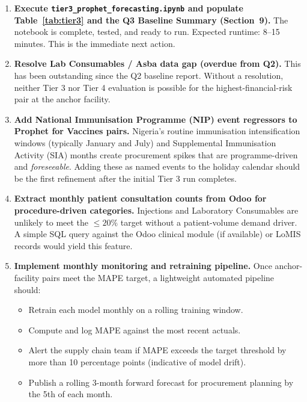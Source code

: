 \documentclass[12pt, a4paper]{article}
\begin{document}
\begin{enumerate}[leftmargin=1.5em, itemsep=7pt]
  \item \textbf{Execute \texttt{tier3\_prophet\_forecasting.ipynb} and
        populate Table~\ref{tab:tier3} and the Q3 Baseline Summary
        (Section~9).}
        The notebook is complete, tested, and ready to run. Expected
        runtime: 8--15 minutes. This is the immediate next action.

  \item \textbf{Resolve Lab Consumables / Asba data gap (overdue from Q2).}
        This has been outstanding since the Q2 baseline report. Without
        a resolution, neither Tier 3 nor Tier 4 evaluation is possible
        for the highest-financial-risk pair at the anchor facility.

  \item \textbf{Add National Immunisation Programme (NIP) event
        regressors to Prophet for Vaccines pairs.}
        Nigeria's routine immunisation intensification windows
        (typically January and July) and Supplemental Immunisation
        Activity (SIA) months create procurement spikes that are
        programme-driven and \textit{foreseeable}. Adding these as
        named events to the holiday calendar should be the first
        refinement after the initial Tier 3 run completes.

  \item \textbf{Extract monthly patient consultation counts from
        Odoo for procedure-driven categories.}
        Injections and Laboratory Consumables are unlikely to meet
        the $\leq 20\%$ target without a patient-volume demand driver.
        A simple SQL query against the Odoo clinical module (if
        available) or LoMIS records would yield this feature.

  \item \textbf{Implement monthly monitoring and retraining pipeline.}
        Once anchor-facility pairs meet the MAPE target, a lightweight
        automated pipeline should:
        \begin{itemize}[leftmargin=1.2em, itemsep=2pt]
          \item Retrain each model monthly on a rolling training window.
          \item Compute and log MAPE against the most recent actuals.
          \item Alert the supply chain team if MAPE exceeds the
                target threshold by more than 10 percentage points
                (indicative of model drift).
          \item Publish a rolling 3-month forward forecast for
                procurement planning by the 5th of each month.
        \end{itemize}


\end{enumerate}
\end{document}
